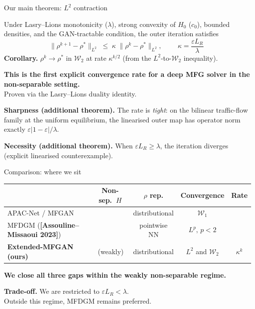 \documentclass[10pt,aspectratio=169]{beamer}
\newcommand{\cmark}{\textcolor{kaustteal!80!black}{\ding{51}}}
\newcommand{\xmark}{\textcolor{accent}{\ding{55}}}
\newcommand{\W}{\mathcal{W}}
\newcommand{\eps}{\varepsilon}
\newcommand{\teal}[1]{\textcolor{kaustteal}{#1}}
\newcommand{\blue}[1]{\textcolor{kaustblue}{#1}}
\newcommand{\citehl}[1]{\textcolor{kaustblue!80!black}{\textbf{[#1]}}}
\begin{document}
\begin{frame}{Our main theorem: $L^2$ contraction}
\begin{resultbox}[title=Theorem (Wasserstein contraction)]
Under Lasry--Lions monotonicity ($\lambda$), strong convexity of $H_0$
($c_0$), bounded densities, and the GAN-tractable condition,
the outer iteration satisfies
\[
  \|\rho^{k+1}-\rho^*\|_{L^2} \;\leq\; \kappa\;\|\rho^k-\rho^*\|_{L^2},
  \qquad
  \boxed{\;\kappa = \dfrac{\eps L_R}{\lambda}\;}
\]
\textbf{Corollary.}  $\rho^k \to \rho^*$ in $\mathcal{W}_2$ at rate
$\kappa^{k/2}$ (from the $L^2$-to-$\W_2$ inequality).
\end{resultbox}

\medskip
\textbf{This is the first explicit convergence rate for a deep
MFG solver in the non-separable setting.}\\
Proven via the \blue{Lasry--Lions duality identity}.

\medskip
\textbf{Sharpness (additional theorem).}  The rate is \emph{tight}:
on the bilinear traffic-flow family at the uniform equilibrium,
the linearised outer map has operator norm exactly $\eps|1-\eps|/\lambda$.

\medskip
\textbf{Necessity (additional theorem).}  When $\eps L_R \geq \lambda$,
the iteration diverges (explicit linearised counterexample).
\end{frame}

\begin{frame}{Comparison: where we sit}
\begin{center}
\renewcommand{\arraystretch}{1.4}
\begin{tabular}{lcccc}
\toprule
& Non-sep.\ $H$ & $\rho$ rep. & Convergence & Rate \\
\midrule
APAC-Net / MFGAN  & \xmark & \teal{distributional} & $\W_1$ & \xmark \\
MFDGM \scriptsize(\citehl{Assouline--Missaoui 2023})
                  & \cmark & \alert{pointwise NN}  & $L^p,\,p<2$ & \xmark \\
\rowcolor{kaustteal!12}
\textbf{Extended-MFGAN (ours)}
                  & \cmark{\scriptsize\,(weakly)} &
                    \teal{distributional} &
                    $L^2$ and $\W_2$ &
                    \blue{$\kappa^k$} \\
\bottomrule
\end{tabular}
\end{center}

\medskip
\textbf{We close all three gaps within the weakly non-separable regime.}

\medskip
\textbf{Trade-off.}  We are restricted to $\eps L_R<\lambda$.\\
Outside this regime, MFDGM remains preferred.
\end{frame}
\end{document}
